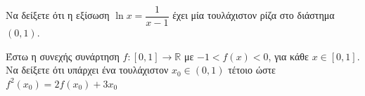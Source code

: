 \documentclass{presentation}
\begin{document}
\begin{askisi}
  Να δείξετε ότι η εξίσωση $\ln x=\dfrac{1}{x-1}$ έχει μία τουλάχιστον ρίζα στο διάστημα $(0,1)$.

\end{askisi}

\begin{askisi}
  Έστω η συνεχής συνάρτηση $f:[0,1]\to\mathbb{R}$ με $-1<f(x)<0$, για κάθε $x\in [0,1]$. Να δείξετε ότι υπάρχει ένα τουλάχιστον $x_0\in (0,1)$ τέτοιο ώστε $f^2(x_0)=2f(x_0)+3x_0$

\end{askisi}
\end{document}
